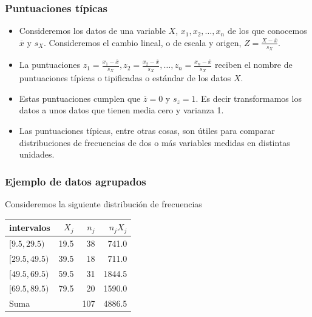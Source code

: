\begin{frame}
\frametitle{Puntuaciones típicas}
\begin{itemize}
\item Consideremos los datos de una variable $X$, $x_1,x_2,\ldots,x_n$ de los que conocemos $\overline{x}$ y $s_X$. Consideremos el cambio lineal, o de escala y origen, $Z=\frac{X-\overline{x}}{s_X}$.
\item La  puntuaciones $z_1=\frac{x_1-\overline{x}}{s_X},z_2=\frac{x_2-\overline{x}}{s_X},\ldots, z_n=\frac{x_n-\overline{x}}{s_X}$
reciben el nombre de puntuaciones típicas o tipificadas o estándar  de los datos $X$.
\item Estas puntuaciones cumplen que $\overline{z}=0$ y $s_z=1$. Es decir transformamos los datos a unos datos que tienen media cero y varianza 1.
\item Las puntuaciones típicas, entre otras cosas,  son útiles para comparar distribuciones de frecuencias de dos o más  variables medidas en distintas unidades.
\end{itemize}
\end{frame}








\begin{frame}
\frametitle{Ejemplo de datos agrupados}

Consideremos la siguiente distribución de frecuencias

\begin{center}
\begin{tabular}{lrrr}
intervalos    & $X_j$ & $n_j$ & $n_jX_j$ \\ \hline $[9.5,29.5)$   & 19.5 &  38 &   741.0
\\ $[29.5,49.5)$  & 39.5 &  18 &   711.0 \\ $[49.5,69.5)$  & 59.5 &  31 & 1844.5 \\
$[69.5,89.5)$  & 79.5 &  20 &  1590.0   \\ \hline
    Suma     &      & 107 &  4886.5
\end{tabular}
\end{center}
\end{frame}

